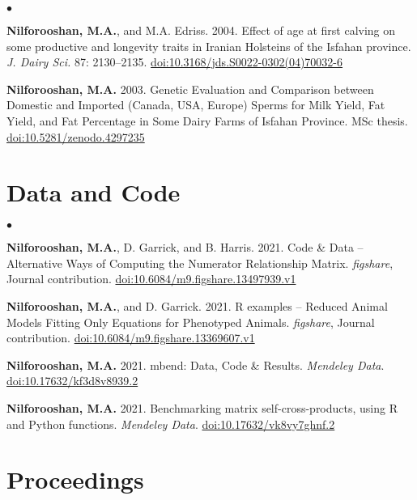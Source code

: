 \documentclass[margin,line]{res}
\newenvironment{list2}{
  \begin{list}{$\bullet$}{%
      \setlength{\itemsep}{0in}
      \setlength{\parsep}{0in} \setlength{\parskip}{0in}
      \setlength{\topsep}{0in} \setlength{\partopsep}{0in}
      \setlength{\leftmargin}{0.2in}}}{\end{list}}
\begin{document}
\begin{resume}
\begin{list2}
\item {\bf Nilforooshan, M.A.}, and M.A. Edriss. 2004. Effect of age at first calving on some productive and longevity traits in Iranian Holsteins of the Isfahan province. {\em J. Dairy Sci.} 87: 2130--2135. \href{https://doi.org/10.3168/jds.S0022-0302(04)70032-6}{doi:10.3168/jds.S0022-0302(04)70032-6}
\item {\bf Nilforooshan, M.A.} 2003. Genetic Evaluation and Comparison between Domestic and Imported (Canada, USA, Europe) Sperms for Milk Yield, Fat Yield, and Fat Percentage in Some Dairy Farms of Isfahan Province. MSc thesis. \href{https://doi.org/10.5281/zenodo.4297235}{doi:10.5281/zenodo.4297235}
\end{list2}
\section{\sc Data and Code}

\begin{list2}
\item {\bf Nilforooshan, M.A.}, D. Garrick, and B. Harris. 2021. Code \& Data -- Alternative Ways of Computing the Numerator Relationship Matrix. {\em figshare}, Journal contribution. \href{https://doi.org/10.6084/m9.figshare.13497939.v1}{doi:10.6084/m9.figshare.13497939.v1}
\item {\bf Nilforooshan, M.A.}, and D. Garrick. 2021. R examples -- Reduced Animal Models Fitting Only Equations for Phenotyped Animals. {\em figshare}, Journal contribution. \href{https://doi.org/10.6084/m9.figshare.13369607.v1}{doi:10.6084/m9.figshare.13369607.v1}
\item {\bf Nilforooshan, M.A.} 2021. mbend: Data, Code \& Results. {\em Mendeley Data}. \href{https://doi.org/10.17632/kf3d8v8939.2}{doi:10.17632/kf3d8v8939.2}
\item {\bf Nilforooshan, M.A.} 2021. Benchmarking matrix self-cross-products, using R and Python functions. {\em Mendeley Data}. \href{https://doi.org/10.17632/vk8vy7ghnf.2}{doi:10.17632/vk8vy7ghnf.2}
\end{list2}
\section{\sc Proceedings}


\end{resume}
\end{document}
